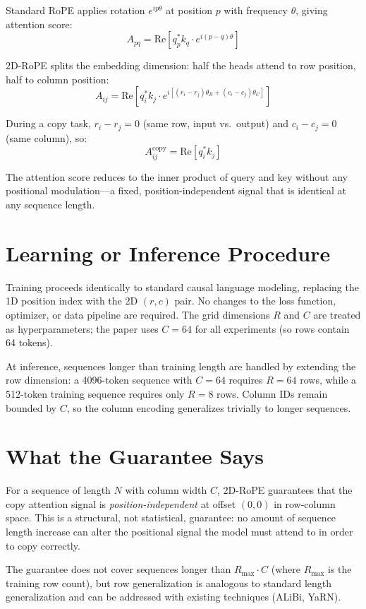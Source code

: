 \documentclass[10pt,twocolumn]{article}
\begin{document}
Standard RoPE applies rotation $e^{ip\theta}$ at position $p$ with
frequency $\theta$, giving attention score:
\[
  A_{pq} = \mathrm{Re}\!\left[ q_p^* k_q \cdot e^{i(p-q)\theta} \right]
\]

2D-RoPE splits the embedding dimension: half the heads attend to
row position, half to column position:
\[
  A_{ij} = \mathrm{Re}\!\left[ q_i^* k_j \cdot e^{i\left[(r_i - r_j)\theta_R
    + (c_i - c_j)\theta_C\right]} \right]
\]

During a copy task, $r_i - r_j = 0$ (same row, input vs.\ output)
and $c_i - c_j = 0$ (same column), so:
\[
  A_{ij}^\text{copy} = \mathrm{Re}\!\left[ q_i^* k_j \right]
\]

The attention score reduces to the inner product of query and key
without any positional modulation---a fixed, position-independent signal
that is identical at any sequence length.

\section{Learning or Inference Procedure}

Training proceeds identically to standard causal language modeling,
replacing the 1D position index with the 2D $(r, c)$ pair. No changes
to the loss function, optimizer, or data pipeline are required. The grid
dimensions $R$ and $C$ are treated as hyperparameters; the paper uses
$C = 64$ for all experiments (so rows contain 64 tokens).

At inference, sequences longer than training length are handled by
extending the row dimension: a 4096-token sequence with $C = 64$
requires $R = 64$ rows, while a 512-token training sequence requires
only $R = 8$ rows. Column IDs remain bounded by $C$, so the column
encoding generalizes trivially to longer sequences.

\section{What the Guarantee Says}

For a sequence of length $N$ with column width $C$, 2D-RoPE guarantees
that the copy attention signal is \emph{position-independent} at offset
$(0, 0)$ in row-column space. This is a structural, not statistical,
guarantee: no amount of sequence length increase can alter the positional
signal the model must attend to in order to copy correctly.

The guarantee does not cover sequences longer than $R_\text{max} \cdot C$
(where $R_\text{max}$ is the training row count), but row generalization
is analogous to standard length generalization and can be addressed with
existing techniques (ALiBi, YaRN).
\end{document}
